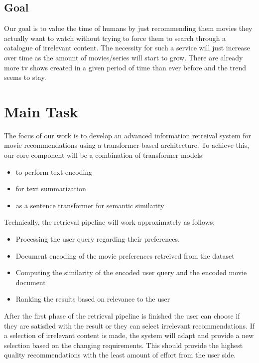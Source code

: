\documentclass[12pt,a4paper]{article}
\begin{document}
  \subsection{Goal}
  Our goal is to value the time of humans by just recommending them movies they actually want to watch without trying to force them to search through a catalogue of irrelevant content.
  The necessity for such a service will just increase over time as the amount of movies/series will start to grow.
  There are already more tv shows created in a given period of time than ever before and the trend seems to stay.

  \section{Main Task}

  The focus of our work is to develop an advanced information retreival system for movie recommendations using a transformer-based architecture.
  To achieve this, our core component will be a combination of transformer models:
  \begin{itemize}
    \item to perform text encoding
    \item for text summarization
    \item as a sentence transformer for semantic similarity
  \end{itemize}

  \noindent Technically, the retrieval pipeline will work approximately as follows:
  \begin{itemize}
    \item Processing the user query regarding their preferences.
    \item Document encoding of the movie preferences retreived from the dataset
    \item Computing the similarity of the encoded user query and the encoded movie document
    \item Ranking the results based on relevance to the user
  \end{itemize}

  \noindent After the first phase of the retrieval pipeline is finished the user can choose if they are satisfied with the result or they can select irrelevant recommendations.
  If a selection of irrelevant content is made, the system will adapt and provide a new selection based on the changing requirements.
  This should provide the highest quality recommendations with the least amount of effort from the user side.
\end{document}
